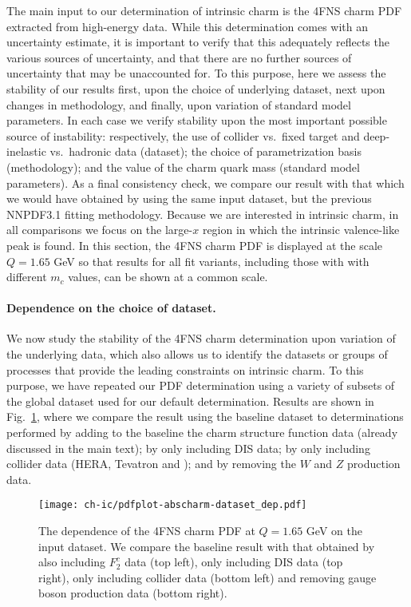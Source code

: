 The main input to our determination of intrinsic charm is the 4FNS
charm PDF extracted from high-energy data. While this
determination comes with an uncertainty estimate, it is important to
verify that this adequately reflects the various sources
of uncertainty, and that there are no further sources of uncertainty
that may be unaccounted for.
%
To this purpose, here we assess the
stability of our results first, upon the choice of underlying dataset,
next upon changes in methodology, and finally, upon variation of
standard model parameters.
%
In each case we verify stability upon the
most important possible source of instability: respectively, the use
of collider vs.\ fixed target and deep-inelastic vs.\ hadronic data
(dataset); the choice of parametrization basis (methodology); and the
value of the charm quark mass (standard model parameters).
%
As a final consistency check, we compare our result with that which we
would have obtained by using the same input dataset, but the previous
NNPDF3.1 fitting methodology.
%
Because we
are interested in intrinsic charm, in all comparisons we focus on
the large-$x$ region in which the intrinsic valence-like peak is found.
%
In this section, the 4FNS
charm PDF is displayed at the scale $Q = 1.65$ GeV so that
results for all fit variants, including
those with with different $m_c$ values, can be shown at a common scale.

\paragraph{Dependence on the choice of dataset.}
%
We now study the stability of the  4FNS charm determination upon
variation of the
underlying data, which also allows us to
identify the datasets or groups of processes that provide
the leading constraints on intrinsic charm.
%
To this purpose, we have repeated our PDF
determination using a  variety of subsets of the global dataset used for
our default determination. Results are shown in
Fig.~\ref{fig:ic/charm_dataset_dep}, where we compare the result using
the 
baseline dataset to determinations performed by adding to the baseline
the  \emc charm
structure function data (already discussed in the main text); by only
including  DIS data; by only including collider data (HERA,
Tevatron and \lhc); and by removing the \lhcb  $W$ and $Z$ production data.

\begin{figure}[t!]
  \begin{center}
    \texttt{[image: ch-ic/pdfplot-abscharm-dataset\_dep.pdf]}
    \caption{\small The dependence of the 4FNS charm PDF at $Q=1.65$ GeV on
      the input dataset.
      We compare the
    baseline result with that obtained by also including 
      \emc $F_2^c$ data (top left), only including DIS data (top
    right), only including collider data (bottom left) and removing
    \lhcb gauge boson production data (bottom right). 
  \label{fig:ic/charm_dataset_dep} }
\end{center}
\end{figure}

